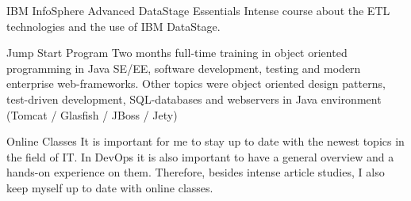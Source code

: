 \documentclass[10pt,letterpaper]{main}
\begin{document}
\begin{paracol}{2}
\begin{leftcolumn}
\cvmetaevent
{IBM InfoSphere Advanced DataStage Essentials}
{}
{}
{Intense course about the ETL technologies and the use of IBM DataStage.}

\cvmetaevent
{Jump Start Program}
{}
{}
{Two months full-time training in object oriented programming in Java SE/EE, software development, testing and modern enterprise web-frameworks. Other topics were object oriented design patterns, test-driven development, SQL-databases and webservers in Java environment (Tomcat / Glasfish / JBoss / Jety)}


\cvmetaevent
{Online Classes}
{}
{}
{It is important for me to stay up to date with the newest topics in the field of IT. In DevOps it is also important to have a general overview and a hands-on experience on them. Therefore, besides intense article studies, I also keep myself up to date with online classes.}


\newpage
\mbox{} %

\end{leftcolumn}
\begin{rightcolumn}
 \\[14pt]
\vspace{-12pt}

\vfill\null
{}

\end{rightcolumn}
\end{paracol}
\end{document}
